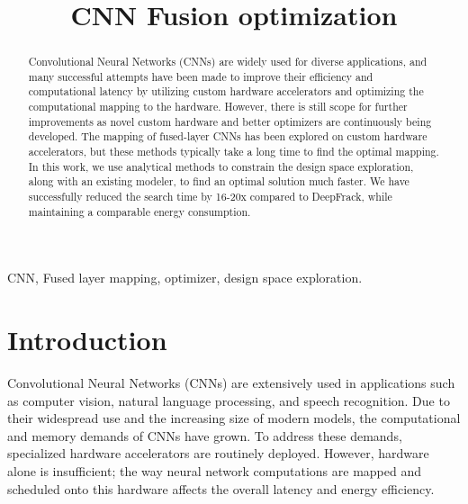 \documentclass[conference]{IEEEtran}
\begin{document}
\title{CNN Fusion optimization\\
}

\author{
\and
{}
}

\maketitle

\begin{abstract}
Convolutional Neural Networks (CNNs) are widely used for diverse applications, and many successful attempts have been made to improve their efficiency and computational latency by utilizing custom hardware accelerators and optimizing the computational mapping to the hardware. However, there is still scope for further improvements as novel custom hardware and better optimizers are continuously being developed. The mapping of fused-layer CNNs has been explored on custom hardware accelerators, but these methods typically take a long time to find the optimal mapping. In this work, we use analytical methods to constrain the design space exploration, along with an existing modeler, to find an optimal solution much faster. We have successfully reduced the search time by 16-20x compared to DeepFrack, while maintaining a comparable energy consumption.
\end{abstract}

\begin{IEEEkeywords}
CNN, Fused layer mapping, optimizer, design space exploration.
\end{IEEEkeywords}

\section{Introduction}
Convolutional Neural Networks (CNNs) are extensively used in applications
such as computer vision, natural language processing, and speech recognition.
Due to their widespread use and the increasing size of modern models,
the computational and memory demands of CNNs have grown.
To address these demands, specialized hardware accelerators are routinely
deployed. However, hardware alone is insufficient; the way neural network
computations are mapped and scheduled onto this hardware
affects the overall latency and energy efficiency.
\end{document}
